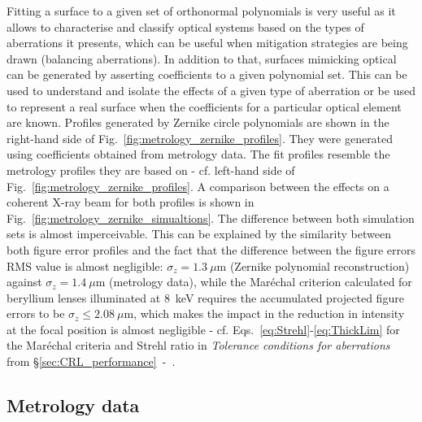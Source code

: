 \begin{refsection}
Fitting a surface to a given set of orthonormal polynomials is very useful as it allows to characterise and classify optical systems based on the types of aberrations it presents, which can be useful when mitigation strategies are being drawn (balancing aberrations). In addition to that, surfaces mimicking optical can be generated by asserting coefficients to a given polynomial set. This can be used to understand and isolate the effects of a given type of aberration or be used to represent a real surface when the coefficients for a particular optical element are known. Profiles generated by Zernike circle polynomials are shown in the right-hand side of Fig.~\ref{fig:metrology_zernike_profiles}. They were generated using coefficients obtained from metrology data. The fit profiles resemble the metrology profiles they are based on - cf. left-hand side of Fig.~\ref{fig:metrology_zernike_profiles}. A comparison between the effects on a coherent X-ray beam for both profiles is shown in Fig.~\ref{fig:metrology_zernike_simualtions}. The difference between both simulation sets is almost imperceivable. This can be explained by the similarity between both figure error profiles and the fact that the difference between the figure errors RMS value is almost negligible: $\sigma_z=1.3~\mu$m (Zernike polynomial reconstruction) against $\sigma_z=1.4~\mu$m (metrology data), while the Mar\'echal criterion calculated for beryllium lenses illuminated at $8$~keV requires the accumulated projected figure errors to be $\sigma_z\leq2.08~\mu$m, which makes the impact in the reduction in intensity at the focal position is almost negligible - cf. Eqs.~\ref{eq:Strehl}-\ref{eq:ThickLim} for the Mar\'echal criteria and Strehl ratio in \textit{Tolerance conditions for aberrations} from \S\ref{sec:CRL_performance}~-~\textit{}.

\subsection{Metrology data}\label{sec:metrology_data}


\end{refsection}
